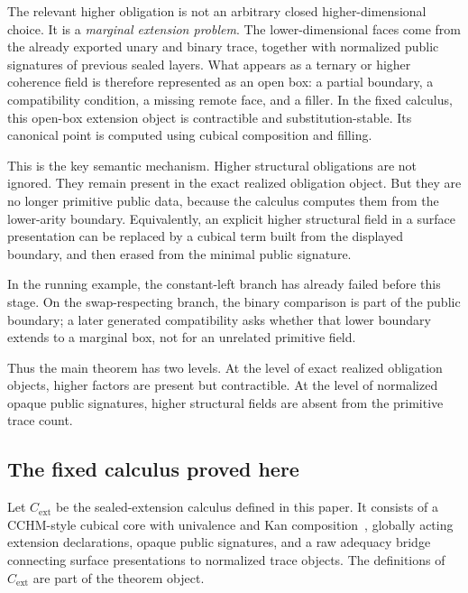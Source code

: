 \documentclass{lmcs}
\begin{document}
The relevant higher obligation is not an arbitrary closed higher-dimensional
choice.  It is a \emph{marginal extension problem}.  The lower-dimensional faces
come from the already exported unary and binary trace, together with normalized
public signatures of previous sealed layers.  What appears as a ternary or higher
coherence field is therefore represented as an open box: a partial boundary, a
compatibility condition, a missing remote face, and a filler.  In the fixed
calculus, this open-box extension object is contractible and substitution-stable.
Its canonical point is computed using cubical composition and filling.

This is the key semantic mechanism.  Higher structural obligations are not
ignored.  They remain present in the exact realized obligation object.  But they
are no longer primitive public data, because the calculus computes them from the
lower-arity boundary.  Equivalently, an explicit higher structural field in a
surface presentation can be replaced by a cubical term built from the displayed
boundary, and then erased from the minimal public signature.

In the running example, the constant-left branch has already failed before this
stage.  On the swap-respecting branch, the binary comparison is part of the
public boundary; a later generated compatibility asks whether that lower
boundary extends to a marginal box, not for an unrelated primitive field.

Thus the main theorem has two levels.  At the level of exact realized obligation
objects, higher factors are present but contractible.  At the level of normalized
opaque public signatures, higher structural fields are absent from the primitive
trace count.

\subsection{The fixed calculus proved here}

Let \(C_{\mathrm{ext}}\) be the sealed-extension calculus defined in this paper.
It consists of a CCHM-style cubical core with univalence and Kan
composition~\cite{cubical}, globally acting extension declarations, opaque
public signatures, and a raw adequacy bridge connecting surface presentations to
normalized trace objects.  The definitions of \(C_{\mathrm{ext}}\) are part of
the theorem object.
\end{document}
